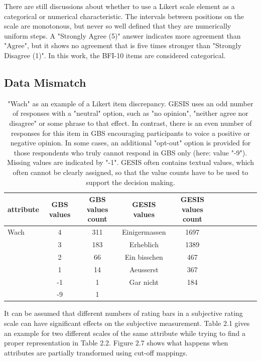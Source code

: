 There are still discussions about whether to use a Likert scale element as a categorical or numerical characteristic. The intervals between positions on the scale are monotonous, but never so well defined that they are numerically uniform steps. A "Strongly Agree (5)" answer indicates more agreement than "Agree", but it shows no agreement that is five times stronger than "Strongly Disagree (1)". In this work, the BFI-10 items are considered categorical.

\subsection{Data Mismatch}

\begin{table}[ht]
    \begin{center}
            {\footnotesize
            \begin{tabular}{l|c|ccccccccc}
                \hline \hline
		attribute & GBS values & GBS values count &  GESIS values & GESIS values count \\
                \hline \hline
                     Wach & 4 & 311 & Einigermassen & 1697 \\
                     & 3 & 183 & Erheblich & 1389 \\
                     & 2 & 66 & Ein bisschen & 467 \\ 
              	& 1 & 14 & Aeusserst & 367 \\	
		& -1 & 1 & Gar nicht & 184 \\		
		& -9 & 1 & & \\
	     \hline \hline
            \end{tabular}}
        \caption{"Wach" as an example of a Likert item discrepancy. GESIS uses an odd number of responses with a "neutral" option, such as "no opinion", "neither agree nor disagree" or some phrase to that effect. In contrast, there is an even number of responses for this item in GBS encouraging participants to voice a positive or negative opinion. In some cases, an additional "opt-out" option is provided for those respondents who truly cannot respond in GBS only (here: value "-9"). Missing values are indicated by "-1". GESIS often contains textual values, which often cannot be clearly assigned, so that the value counts have to be used to support the decision making.}
\end{center}
\end{table}
It can be assumed that different numbers of rating bars in a subjective rating scale can have significant effects on the subjective measurement. Table 2.1 gives an example for two different scales of the same attribute while trying to find a proper representation in Table 2.2. Figure 2.7 shows what happens when attributes are partially transformed using cut-off mappings. 
